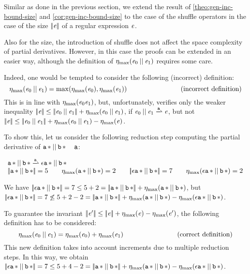 Similar as done in the previous section, we extend the result of \cref{theo:gen-inc-bound-size} and \cref{cor:gen-inc-bound-size} to the case of the shuffle operators in the case of the size ${{\mid\!\mid}}{\mathit {e}}{{\mid\!\mid}}$ of a regular expression $\mathit {e}$.

Also for the size, the introduction of shuffle does not affect the space complexity of partial derivatives. However, in this case the proofs can be extended in an easier way, although the definition of ${\eta_{\max}}({\mathit {e}_0\mathbin{||}\mathit {e}_1})$ requires some care.

Indeed, one would be tempted to consider the following (incorrect) definition:
\[
 {\eta_{\max}}({\mathit {e}_0\mathbin{||}\mathit {e}_1})=\max({\eta_{\max}}({\mathit {e}_0}),{\eta_{\max}}({\mathit {e}_1}))
 \qquad\qquad\qquad\qquad\mbox{(incorrect definition)}
\]
This is in line with ${\eta_{\max}}({\mathit {e}_0\mathit {e}_1})$,
but, unfortunately, verifies only the weaker inequality
${{\mid\!\mid}}{\mathit {e}}{{\mid\!\mid}}\leq{{\mid\!\mid}}{\ensuremath{\mathit {e}}_0\mathbin{||}\ensuremath{\mathit {e}}_1}{{\mid\!\mid}}+{\eta_{\max}}({\mathit {e}_0\mathbin{||}\mathit {e}_1})$, if $\re_0\shuffleop\re_1\parDer{\sym}\re$, but not ${{\mid\!\mid}}{\mathit {e}}{{\mid\!\mid}}\leq{{\mid\!\mid}}{\ensuremath{\mathit {e}}_0\mathbin{||}\ensuremath{\mathit {e}}_1}{{\mid\!\mid}}+{\eta_{\max}}({\mathit {e}_0\mathbin{||}\mathit {e}_1})-{\eta_{\max}}({\mathit {e}})$.

To show this, let us consider the following reduction step computing the partial derivative of ${{\mathtt {a}}\mathop{*}}\mathbin{||}{{\mathtt {b}}\mathop{*}}$ \wrt~ $\mathtt {a}$:
\begin{flushleft}
 $
  \begin{array}{l}
   \starop{\sym}\shuffleop\starop{\asym}\parDer{\sym}\eps\catop\starop{\sym}\shuffleop\starop{\asym} \\
   \tsize{\starop{\sym}\shuffleop\starop{\asym}}=5 \qquad
   \incFunSize{\starop{\sym}\shuffleop\starop{\asym}}=2 \qquad
   \tsize{\eps\catop\starop{\sym}\shuffleop\starop{\asym}}=7 \qquad
   \incFunSize{\eps\catop\starop{\sym}\shuffleop\starop{\asym}}=2
  \end{array}
 $
\end{flushleft}
We have ${{\mid\!\mid}}{\mathtt {\epsilon}{{\mathtt {a}}\mathop{*}}\mathbin{||}{{\mathtt {b}}\mathop{*}}}{{\mid\!\mid}}=7\leq 5+2={{\mid\!\mid}}{{{\mathtt {a}}\mathop{*}}\mathbin{||}{{\mathtt {b}}\mathop{*}}}{{\mid\!\mid}}+{\eta_{\max}}({{{\mathtt {a}}\mathop{*}}\mathbin{||}{{\mathtt {b}}\mathop{*}}})$, but
${{\mid\!\mid}}{\mathtt {\epsilon}{{\mathtt {a}}\mathop{*}}\mathbin{||}{{\mathtt {b}}\mathop{*}}}{{\mid\!\mid}}=7\not\leq 5+2-2={{\mid\!\mid}}{{{\mathtt {a}}\mathop{*}}\mathbin{||}{{\mathtt {b}}\mathop{*}}}{{\mid\!\mid}}+{\eta_{\max}}({{{\mathtt {a}}\mathop{*}}\mathbin{||}{{\mathtt {b}}\mathop{*}}})-{\eta_{\max}}({\mathtt {\epsilon}{{\mathtt {a}}\mathop{*}}\mathbin{||}{{\mathtt {b}}\mathop{*}}})$.

To guarantee the invariant ${{\mid\!\mid}}{\mathit {e}'}{{\mid\!\mid}}\leq{{\mid\!\mid}}{\ensuremath{\mathit {e}}}{{\mid\!\mid}}+{\eta_{\max}}({\mathit {e}})-{\eta_{\max}}({\mathit {e}'})$, the following definition has to be considered:
\[
 {\eta_{\max}}({\mathit {e}_0\mathbin{||}\mathit {e}_1})={\eta_{\max}}({\mathit {e}_0})+{\eta_{\max}}({\mathit {e}_1}) \qquad\qquad\qquad\qquad\mbox{(correct definition)}
\]
This new definition takes into account increments due to multiple reduction steps. In this way, we obtain ${{\mid\!\mid}}{\mathtt {\epsilon}{{\mathtt {a}}\mathop{*}}\mathbin{||}{{\mathtt {b}}\mathop{*}}}{{\mid\!\mid}}=7\leq 5+4-2={{\mid\!\mid}}{{{\mathtt {a}}\mathop{*}}\mathbin{||}{{\mathtt {b}}\mathop{*}}}{{\mid\!\mid}}+{\eta_{\max}}({{{\mathtt {a}}\mathop{*}}\mathbin{||}{{\mathtt {b}}\mathop{*}}})-{\eta_{\max}}({\mathtt {\epsilon}{{\mathtt {a}}\mathop{*}}\mathbin{||}{{\mathtt {b}}\mathop{*}}})$.

